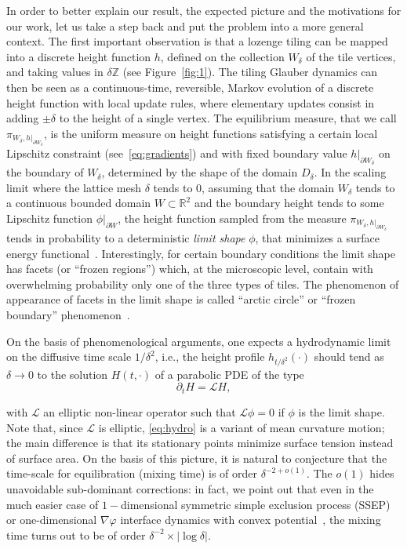 \documentclass[10pt]{amsart}
\theoremstyle{definition}\newtheorem{defi}[theo]{Definition}\newtheorem{rema}[theo]{Remark}\newtheorem{exam}[theo]{Example}\newtheorem{exem}[theo]{Example}\newtheorem{nota}[theo]{Notation}
\newcommand{\R}{\mathbb{R}}
\newcommand{\Z}{\mathbb{Z}}
\newcommand{\clL}{\mathcal{L}}
\begin{document}
In order to better explain our result, the expected picture and the motivations for our work, let us take a step back and put the problem into a more general context. The first important observation is that a lozenge tiling can be mapped into a discrete height function $h$, defined on the collection $W_\delta$ of the tile vertices, and taking values in $\delta\Z$ (see Figure~\ref{fig:1}). The tiling Glauber dynamics can then be seen as a continuous-time, reversible, Markov evolution of a discrete height function with local update rules, where elementary updates consist in adding $\pm \delta$ to the height of a single vertex. The equilibrium measure, that we call $\pi_{W_\delta,h|_{\partial W_\delta}}$, is the uniform measure on height functions satisfying a certain local Lipschitz constraint (see~\eqref{eq:gradients}) and with fixed boundary value $h|_{\partial W_\delta}$ on the boundary of $W_\delta$, determined by the shape of the domain $D_\delta$. In the scaling limit where the lattice mesh $\delta$ tends to $0$, assuming that the domain $W_\delta$ tends to a continuous bounded domain $W\subset \R^2$ and the boundary height tends to some Lipschitz function $\phi|_{\partial W}$, the height function sampled from the measure $\pi_{W_\delta,h|_{\partial W_\delta}}$ tends in probability to a deterministic \emph{limit shape} $\phi$, that minimizes a surface energy functional~\cite{CKP,CLP}. Interestingly, for certain boundary conditions the limit shape has facets (or ``frozen regions'') which, at the microscopic level, contain with overwhelming probability only one of the three types of tiles. The phenomenon of appearance of facets in the limit shape is called ``arctic circle'' or ``frozen boundary'' phenomenon~\cite{CKP,CLP,KO}.

On the basis of phenomenological arguments, one expects a hydrodynamic limit on the diffusive time scale $1/\delta^2$, i.e., the height profile $h_{t/\delta^2}(\cdot)$ should tend as $\delta\to0$ to the solution $H(t,\cdot)$ of a parabolic PDE of the type
\begin{equation}\label{eq:hydro}
\partial_t H=\clL H,
\end{equation}

with $\clL$ an elliptic non-linear operator such that $\clL\phi=0$ if $\phi$ is the limit shape. Note that, since $\clL$ is elliptic, \eqref{eq:hydro} is a variant of mean curvature motion; the main difference is that its stationary points minimize surface tension instead of surface area. On the basis of this picture, it is natural to conjecture that the time-scale for equilibration (mixing time) is of order $\delta^{-2+o(1)}$. The $o(1)$ hides unavoidable sub-dominant corrections: in fact, we point out that even in the much easier case of $1-$dimensional symmetric simple exclusion process (SSEP) \cite{Lacoin,Wilson} or one-dimensional $\nabla\varphi$ interface dynamics with convex potential~\cite{CLL}, the mixing time turns out to be of order $\delta^{-2}\times |\log\delta|$.
\end{document}

